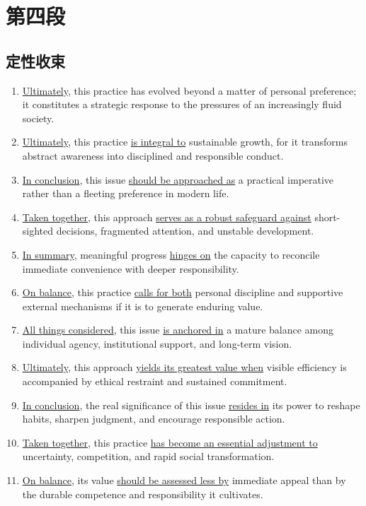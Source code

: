 \section{第四段}

\subsection{定性收束}

\begin{enumerate}
    \item \underline{Ultimately}, this practice has evolved beyond a matter of personal preference; it constitutes a strategic response to the pressures of an increasingly fluid society.

    \item \underline{Ultimately}, this practice \underline{is integral to} sustainable growth, for it transforms abstract awareness into disciplined and responsible conduct.

    \item \underline{In conclusion}, this issue \underline{should be approached as} a practical imperative rather than a fleeting preference in modern life.

    \item \underline{Taken together}, this approach \underline{serves as a robust safeguard against} short-sighted decisions, fragmented attention, and unstable development.

    \item \underline{In summary}, meaningful progress \underline{hinges on} the capacity to reconcile immediate convenience with deeper responsibility.

    \item \underline{On balance}, this practice \underline{calls for both} personal discipline and supportive external mechanisms if it is to generate enduring value.

    \item \underline{All things considered}, this issue \underline{is anchored in} a mature balance among individual agency, institutional support, and long-term vision.

    \item \underline{Ultimately}, this approach \underline{yields its greatest value when} visible efficiency is accompanied by ethical restraint and sustained commitment.

    \item \underline{In conclusion}, the real significance of this issue \underline{resides in} its power to reshape habits, sharpen judgment, and encourage responsible action.

    \item \underline{Taken together}, this practice \underline{has become an essential adjustment to} uncertainty, competition, and rapid social transformation.

    \item \underline{On balance}, its value \underline{should be assessed less by} immediate appeal than by the durable competence and responsibility it cultivates.
\end{enumerate}

